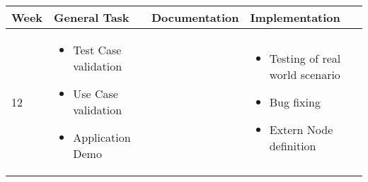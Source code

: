 \begin{center}
    \begin{tabular}{ | l | p{4cm} | p{4cm} | p{5cm} |}
    \hline
    Week & General Task & Documentation & Implementation \\ \hline
    12 & \begin{itemize}
     \item Test Case validation
     \item Use Case validation
     \item Application Demo
     \end{itemize} &
      & \begin{itemize}
     \item Testing of real world scenario
     \item Bug fixing 
     \item Extern Node definition
    \end{itemize}  \\
    \hline
    \end{tabular}
\end{center}
 
